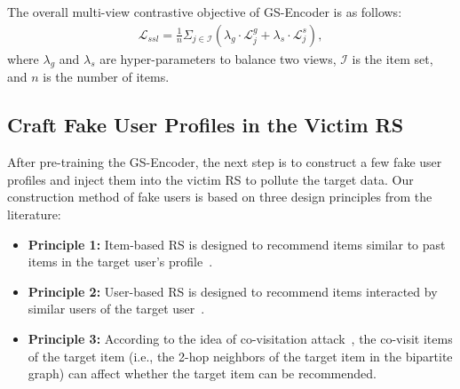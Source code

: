 The overall multi-view contrastive objective of GS-Encoder is as follows:
\begin{equation}
	\begin{aligned}
		\mathcal{L}_{ssl} = \frac{1}{n} \Sigma_{j \in \mathcal{I}}
		(\lambda_g \cdot \mathcal{L}_j^{g} + \lambda_{s} \cdot \mathcal{L}_j^{s}),
	\end{aligned}
\end{equation}
where $\lambda_g$ and $\lambda_{s}$ are hyper-parameters to balance two views, $\mathcal{I}$ is the item set, and $n$ is the number of items.

\subsection{Craft Fake User Profiles in the Victim RS}

After pre-training the GS-Encoder, the next step is to construct a few fake user profiles and inject them into the victim RS to pollute the target data.
Our construction method of fake users is based on three design principles from the literature:
\begin{itemize}
\item \textbf{Principle 1:} Item-based RS is designed to recommend items similar to past items in the target user's profile~\citep{SarwarKKR01}.  

\item \textbf{Principle 2:} User-based RS is designed to recommend items interacted by similar users of the target user~\citep{HerlockerKR00}.  

\item \textbf{Principle 3:} According to the idea of co-visitation attack~\citep{YangGC17}, the co-visit items of the target item (i.e., the 2-hop neighbors of the target item in the bipartite graph) can affect whether the target item can be recommended.  
\end{itemize}


